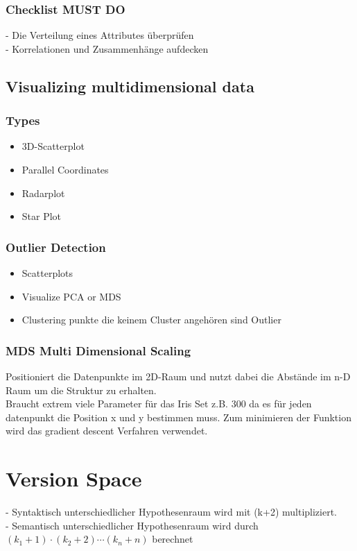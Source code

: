 \documentclass[a4paper]{scrartcl}
\begin{document}
\subsubsection{Checklist MUST DO}
- Die Verteilung eines Attributes überprüfen\\
- Korrelationen und Zusammenhänge aufdecken\\

\subsection{Visualizing multidimensional data}
\subsubsection{Types}
\begin{itemize}
\item 3D-Scatterplot
\item Parallel Coordinates
\item Radarplot
\item Star Plot 
\end{itemize}
\subsubsection{Outlier Detection}
\begin{itemize}
\item Scatterplots
\item Visualize PCA or MDS
\item Clustering punkte die keinem Cluster angehören sind Outlier
\end{itemize}

\subsubsection{MDS Multi Dimensional Scaling}
Positioniert die Datenpunkte im 2D-Raum und nutzt dabei die Abstände im n-D Raum um die Struktur zu erhalten.\\
Braucht extrem viele Parameter für das Iris Set z.B. 300 da es für jeden datenpunkt die Position x und y bestimmen muss. Zum minimieren der Funktion wird das gradient descent Verfahren verwendet.

\section{Version Space}
- Syntaktisch unterschiedlicher Hypothesenraum wird mit (k+2) multipliziert.\\
- Semantisch unterschiedlicher Hypothesenraum wird durch $(k_1+1)\cdot(k_2+2)\cdots(k_n+n)$ berechnet\\
\end{document}
